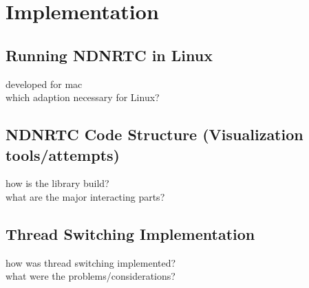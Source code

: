 \chapter{Implementation} \label{chapter:Implementation}


\section{Running NDNRTC in Linux}
developed for mac \\
which adaption necessary for Linux?

\section{NDNRTC Code Structure (Visualization tools/attempts)}
how is the library build? \\
what are the major interacting parts?

\section{Thread Switching Implementation}
how was thread switching implemented? \\
what were the problems/considerations?

